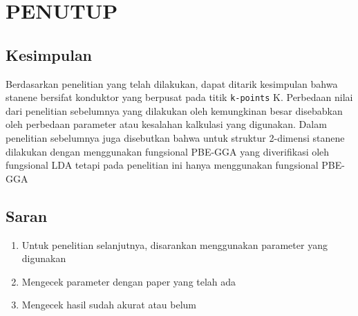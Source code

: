 \renewcommand{\thechapter}{\Roman{chapter}}
\chapter{PENUTUP}
\renewcommand{\thechapter}{\arabic{chapter}}

\section{Kesimpulan}

Berdasarkan penelitian yang telah dilakukan, dapat ditarik kesimpulan bahwa stanene bersifat konduktor yang berpusat pada titik \texttt{k-points} K. Perbedaan nilai dari penelitian sebelumnya yang dilakukan oleh \citeauthor{sagar2019} kemungkinan besar disebabkan oleh perbedaan parameter atau kesalahan kalkulasi yang digunakan. Dalam penelitian sebelumnya juga disebutkan bahwa untuk struktur 2-dimensi stanene dilakukan dengan menggunakan fungsional PBE-GGA yang diverifikasi oleh fungsional LDA tetapi pada penelitian ini hanya menggunakan fungsional PBE-GGA

\section{Saran}
\begin{enumerate}
    \item Untuk penelitian selanjutnya, disarankan menggunakan parameter yang digunakan
    \item Mengecek parameter dengan paper yang telah ada
    \item Mengecek hasil sudah akurat atau belum

\end{enumerate}

